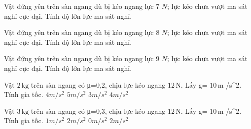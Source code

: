 \begin{bt}
Vật đứng yên trên sàn ngang dù bị kéo ngang lực 7 $N$; lực kéo chưa vượt ma sát nghỉ cực đại. Tính độ lớn lực ma sát nghỉ.
\end{bt}

\begin{bt}
Vật đứng yên trên sàn ngang dù bị kéo ngang lực 8 $N$; lực kéo chưa vượt ma sát nghỉ cực đại. Tính độ lớn lực ma sát nghỉ.
\end{bt}

\begin{bt}
Vật đứng yên trên sàn ngang dù bị kéo ngang lực 9 $N$; lực kéo chưa vượt ma sát nghỉ cực đại. Tính độ lớn lực ma sát nghỉ.
\end{bt}

\begin{ex}
Vật $2\,\text{kg}$ trên sàn ngang có μ=0,2, chịu lực kéo ngang $12\,\text{N}$. Lấy g= $10\,\text{m}$ /s^2. Tính gia tốc.
\choice
{$4 m/s^2$}
{$5 m/s^2$}
{$3 m/s^2$}
{\True $4 m/s^2$}
\end{ex}

\begin{ex}
Vật $3\,\text{kg}$ trên sàn ngang có μ=0,3, chịu lực kéo ngang $12\,\text{N}$. Lấy g= $10\,\text{m}$ /s^2. Tính gia tốc.
\choice
{\True $1 m/s^2$}
{$2 m/s^2$}
{$0 m/s^2$}
{$2 m/s^2$}
\end{ex}

